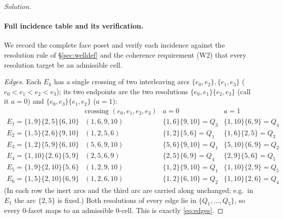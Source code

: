 \documentclass{amsart}
\theoremstyle{definition}
\begin{document}
\begin{proof}[Solution]
\paragraph{Full incidence table and its verification.}
We record the complete face poset and verify each incidence against the resolution
rule of \S\ref{sec:welldef} and the coherence requirement (W2) that every resolution
target be an admissible cell.

\emph{Edges.} Each $E_k$ has a single crossing of two interleaving arcs
$\{e_0,e_2\},\{e_1,e_3\}$ ($e_0<e_1<e_2<e_3$); its two endpoints are the two
resolutions $\{e_0,e_1\}\{e_2,e_3\}$ (call it $a{=}0$) and $\{e_0,e_3\}\{e_1,e_2\}$
($a{=}1$):
\[
\begin{array}{l|c|c|c}
 & \text{crossing }(e_0,e_1,e_2,e_3) & a{=}0 & a{=}1\\\hline
E_1=\{1,9\}\{2,5\}\{6,10\} & (1,6,9,10) & \{1,6\}\{9,10\}=Q_3 & \{1,10\}\{6,9\}=Q_4\\
E_2=\{1,5\}\{2,6\}\{9,10\} & (1,2,5,6) & \{1,2\}\{5,6\}=Q_1 & \{1,6\}\{2,5\}=Q_3\\
E_3=\{1,2\}\{5,9\}\{6,10\} & (5,6,9,10) & \{5,6\}\{9,10\}=Q_1 & \{5,10\}\{6,9\}=Q_2\\
E_4=\{1,10\}\{2,6\}\{5,9\} & (2,5,6,9) & \{2,5\}\{6,9\}=Q_4 & \{2,9\}\{5,6\}=Q_5\\
E_5=\{1,9\}\{2,10\}\{5,6\} & (1,2,9,10) & \{1,2\}\{9,10\}=Q_1 & \{1,10\}\{2,9\}=Q_5\\
E_6=\{1,5\}\{2,10\}\{6,9\} & (1,2,6,10) & \{1,2\}\{6,10\}=Q_2 & \{1,10\}\{2,6\}=Q_4
\end{array}
\]
(In each row the inert arcs and the third arc are carried along unchanged; e.g.\ in
$E_1$ the arc $\{2,5\}$ is fixed.) Both resolutions of every edge lie in
$\{Q_1,\dots,Q_5\}$, so every $0$-facet maps to an admissible $0$-cell. This is exactly
\eqref{eq:edges}.


\end{proof}
\end{document}
